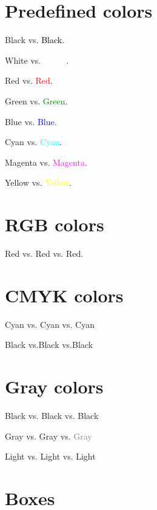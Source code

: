 \documentclass{article}
\begin{document}
\section{Predefined colors}
{\color{black} Black} vs. \textcolor{black}{Black}.

{\color{white} White} vs. \textcolor{white}{White}.

{\color{red} Red} vs. \textcolor{red}{Red}.

{\color{green} Green} vs. \textcolor{green}{Green}.

{\color{blue} Blue} vs. \textcolor{blue}{Blue}.

{\color{cyan} Cyan} vs. \textcolor{cyan}{Cyan}.

{\color{magenta} Magenta} vs. \textcolor{magenta}{Magenta}.

{\color{yellow} Yellow} vs. \textcolor{yellow}{Yellow}.

\section{RGB colors}
{\color[rgb]{1.0,0.0,0.0} Red}
vs. \textcolor[rgb]{1.0,0.0,0.0}{Red}
vs. \textcolor{rgbred}{Red}.

\section{CMYK colors}
{\color[cmyk]{1.0,0.0,0.0,0.0} Cyan}
vs. \textcolor[cmyk]{1.0,0.0,0.0,0.0}{Cyan}
vs. \textcolor{cmykcyan}{Cyan}

{\color[cmyk]{0.0,0.0,0.0,1.0} Black}
vs.\textcolor[cmyk]{0.0,0.0,0.0,1.0}{Black}
vs.\textcolor{cmykblack}{Black}

\section{Gray colors}
{\color[gray]{0.0} Black}
vs. \textcolor[gray]{0.0}{Black}
vs. \textcolor{grayblack}{Black}

{\color[gray]{0.5} Gray}
vs. \textcolor[gray]{0.5}{Gray}
vs. \textcolor{gray}{Gray}

{\color[gray]{0.9} Light}
vs. \textcolor[gray]{0.9}{Light}
vs. \textcolor{light}{Light}


\section{Boxes}
\end{document}
